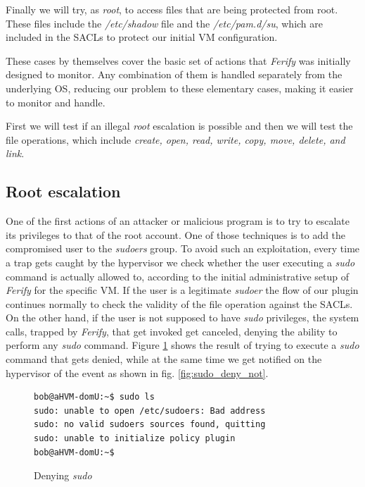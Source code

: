\par Finally we will try, as \emph{root}, to access files that are being protected from root. These files include the \emph{/etc/shadow} file and the \emph{/etc/pam.d/su}, which are included in the \acp{SACL} to protect our initial \ac{VM} configuration.

\par These cases by themselves cover the basic set of actions that \emph{Ferify} was initially designed to monitor. Any combination of them is handled separately from the underlying \ac{OS}, reducing our problem to these elementary cases, making it easier to monitor and handle.

\par First we will test if an illegal \emph{root} escalation is possible and then we will test the file operations, which include \emph{create, open, read, write, copy, move, delete, and link}.

\subsection{Root escalation}

\par One of the first actions of an attacker or malicious program is to try to escalate its privileges to that of the root account. One of those techniques is to add the compromised user to the \emph{sudoers} group. To avoid such an exploitation, every time a trap gets caught by the hypervisor we check whether the user executing a \emph{sudo} command is actually allowed to, according to the initial administrative setup of \emph{Ferify} for the specific \ac{VM}. If the user is a legitimate \emph{sudoer} the flow of our plugin continues normally to check the validity of the file operation against the \acp{SACL}. On the other hand, if the user is not supposed to have \emph{sudo} privileges, the system calls, trapped by \emph{Ferify}, that get invoked get canceled, denying the ability to perform any \emph{sudo} command. Figure \ref{fig:sudo_deny} shows the result of trying to execute a \emph{sudo} command that gets denied, while at the same time we get notified on the hypervisor of the event as shown in fig. \ref{fig:sudo_deny_not}.

\begin{figure}[ht]
	\centering
	\footnotesize{\selectfont 
		\begin{lstlisting}
bob@aHVM-domU:~$ sudo ls
sudo: unable to open /etc/sudoers: Bad address
sudo: no valid sudoers sources found, quitting
sudo: unable to initialize policy plugin
bob@aHVM-domU:~$
		\end{lstlisting}}
	\caption{Denying \emph{sudo}}
	\label{fig:sudo_deny}
\end{figure}

